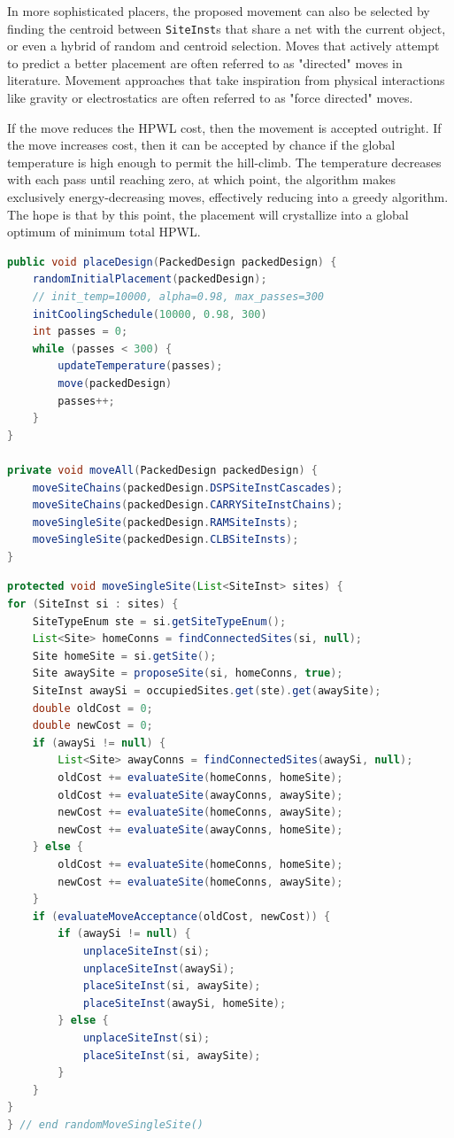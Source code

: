 In more sophisticated placers, the proposed movement can also be selected by finding the centroid between \texttt{SiteInst}s that share a net with the current object, or even a hybrid of random and centroid selection. 
Moves that actively attempt to predict a better placement are often referred to as "directed" moves in literature. 
Movement approaches that take inspiration from physical interactions like gravity or electrostatics are often referred to as "force directed" moves. 


If the move reduces the HPWL cost, then the movement is accepted outright.
If the move increases cost, then it can be accepted by chance if the global temperature is high enough to permit the hill-climb.
The temperature decreases with each pass until reaching zero, at which point, the algorithm makes exclusively energy-decreasing moves, effectively reducing into a greedy algorithm. 
The hope is that by this point, the placement will crystallize into a global optimum of minimum total HPWL. 

\newcolumn
\begin{lstlisting}[language=java, caption={SA pseudocode: outer loop}, label={lst:sa_outer}]
public void placeDesign(PackedDesign packedDesign) {
    randomInitialPlacement(packedDesign);
    // init_temp=10000, alpha=0.98, max_passes=300
    initCoolingSchedule(10000, 0.98, 300)
    int passes = 0;
    while (passes < 300) {
        updateTemperature(passes);
        move(packedDesign)
        passes++;
    }
}

private void moveAll(PackedDesign packedDesign) {
    moveSiteChains(packedDesign.DSPSiteInstCascades);
    moveSiteChains(packedDesign.CARRYSiteInstChains);
    moveSingleSite(packedDesign.RAMSiteInsts);
    moveSingleSite(packedDesign.CLBSiteInsts);
}
\end{lstlisting}


\begin{lstlisting}[language=java, caption={Single Site Movement}, label={lst:sa_move_single}]
protected void moveSingleSite(List<SiteInst> sites) {
for (SiteInst si : sites) {
    SiteTypeEnum ste = si.getSiteTypeEnum();
    List<Site> homeConns = findConnectedSites(si, null);
    Site homeSite = si.getSite();
    Site awaySite = proposeSite(si, homeConns, true);
    SiteInst awaySi = occupiedSites.get(ste).get(awaySite);
    double oldCost = 0;
    double newCost = 0;
    if (awaySi != null) {
        List<Site> awayConns = findConnectedSites(awaySi, null);
        oldCost += evaluateSite(homeConns, homeSite);
        oldCost += evaluateSite(awayConns, awaySite);
        newCost += evaluateSite(homeConns, awaySite);
        newCost += evaluateSite(awayConns, homeSite);
    } else {
        oldCost += evaluateSite(homeConns, homeSite);
        newCost += evaluateSite(homeConns, awaySite);
    }
    if (evaluateMoveAcceptance(oldCost, newCost)) {
        if (awaySi != null) {
            unplaceSiteInst(si);
            unplaceSiteInst(awaySi);
            placeSiteInst(si, awaySite);
            placeSiteInst(awaySi, homeSite);
        } else {
            unplaceSiteInst(si);
            placeSiteInst(si, awaySite);
        }
    }
}
} // end randomMoveSingleSite()
\end{lstlisting}

